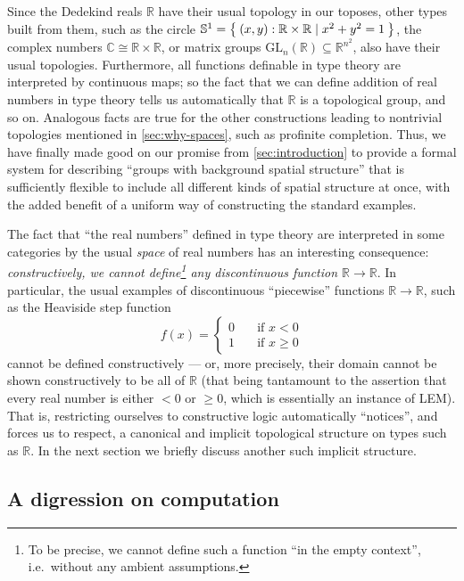 \documentclass[12pt]{article}
\let\setof\Set
\def\R{\mathbb{R}}
\def\topcirc{\mathbb{S}^1}
\numberwithin{equation}{section}
\begin{document}
Since the Dedekind reals $\R$ have their usual topology in our toposes, other types built from them, such as the circle $\topcirc = \setof{ (x,y):\R\times\R \mid x^2+y^2=1 }$, the complex numbers $\mathbb{C} \cong \R\times \R$, or matrix groups $\mathrm{GL}_n(\R) \subseteq \R^{n^2}$,
also have their usual topologies.
Furthermore, all functions definable in type theory are interpreted by continuous maps; so the fact that we can define addition of real numbers in type theory tells us automatically that $\R$ is a topological group, and so on.
Analogous facts are true for the other constructions leading to nontrivial topologies mentioned in \cref{sec:why-spaces}, such as profinite completion.
Thus, we have finally made good on our promise from \cref{sec:introduction} to provide a formal system for describing ``groups with background spatial structure'' that is sufficiently flexible to include all different kinds of spatial structure at once, with the added benefit of a uniform way of constructing the standard examples.

The fact that ``the real numbers'' defined in type theory are interpreted in some categories by the usual \emph{space} of real numbers has an interesting consequence: \textit{constructively, we cannot define\footnote{To be precise, we cannot define such a function ``in the empty context'', i.e.\ without any ambient assumptions.} any discontinuous function $\R\to\R$}.
In particular, the usual examples of discontinuous ``piecewise'' functions $\R\to\R$, such as the Heaviside step function
\[ f(x) =
\begin{cases}
  0 &\quad \text{if } x<0\\
  1 &\quad \text{if } x\ge 0
\end{cases}\]
cannot be defined constructively --- or, more precisely, their domain cannot be shown constructively to be all of $\R$ (that being tantamount to the assertion that every real number is either $<0$ or $\ge 0$, which is essentially an instance of LEM).
That is, restricting ourselves to constructive logic automatically ``notices'', and forces us to respect, a canonical and implicit topological structure on types such as $\R$.
In the next section we briefly discuss another such implicit structure.


\subsection{A digression on computation}
\label{sec:compute}
\end{document}
